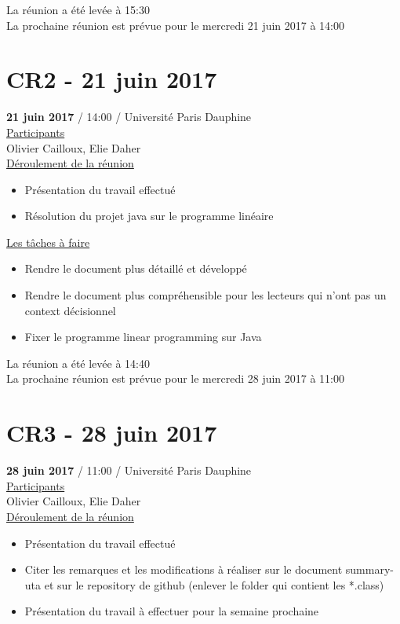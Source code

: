 \documentclass{report}
\begin{document}
\begin{appendices}
La réunion a été levée à 15:30\\

La prochaine réunion est prévue pour le mercredi 21 juin 2017 à 14:00


\newpage
\section{CR2 - 21 juin 2017}
\textbf{21 juin 2017} / 14:00 / Université Paris Dauphine \\

\underline{Participants} \\

Olivier Cailloux, Elie Daher\\

\underline{Déroulement de la réunion} \\
\begin{itemize}
	\item Présentation du travail effectué
	\item Résolution du projet java sur le programme linéaire\\
\end{itemize}

\underline{Les tâches à faire} \\
\begin{itemize}
	\item Rendre le document plus détaillé et développé
	\item Rendre le document plus compréhensible pour les lecteurs qui n’ont pas un context décisionnel
	\item Fixer le programme linear programming sur Java\\
\end{itemize}

La réunion a été levée à 14:40\\

La prochaine réunion est prévue pour le mercredi 28 juin 2017 à 11:00
\newpage
\section{CR3 - 28 juin 2017}
\textbf{28 juin 2017} / 11:00 / Université Paris Dauphine \\

\underline{Participants} \\

Olivier Cailloux, Elie Daher\\

\underline{Déroulement de la réunion}\\
\begin{itemize}
	\item Présentation du travail effectué
	\item Citer les remarques et les modifications à réaliser sur le document summary-uta et sur le repository de github (enlever le folder qui contient les *.class)
	\item Présentation du travail à effectuer pour la semaine prochaine\\
\end{itemize}


\end{appendices}
\end{document}
